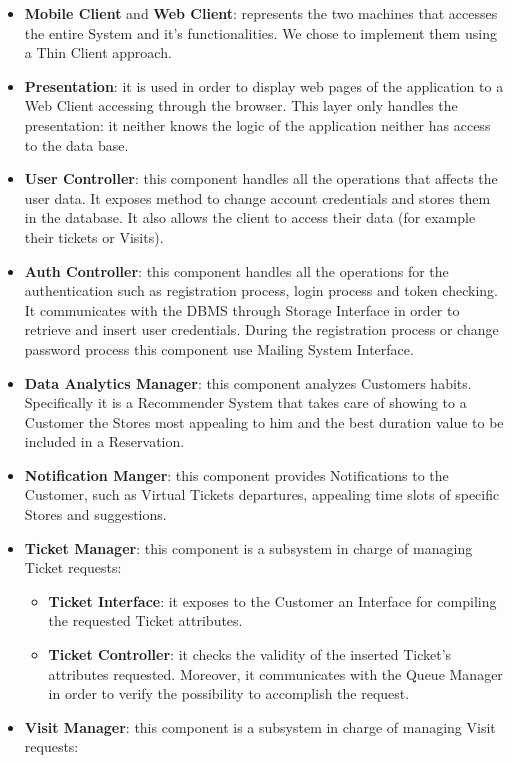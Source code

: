 \documentclass[a4paper, 12pt, oneside, table]{article}
\begin{document}
\begin{itemize}
    \item \label{cv:client}\textbf{Mobile Client} and \textbf{Web Client}: represents the two machines that accesses the entire System and it's functionalities. We chose to implement them using a Thin Client approach.
    \item \textbf{Presentation}: it is used in order to display web pages of the application to a Web Client accessing through the browser. This layer only handles the presentation: it neither knows the logic of the application neither has access to the data base.
    \item \textbf{User Controller}: this component handles all the operations that affects the user data. It exposes method to change account credentials and stores them in the database. It also allows the client to access their data (for example their tickets or Visits).
    \item \textbf{Auth Controller}: this component handles all the operations for the authentication such as registration process, login process and token checking. It communicates with the DBMS through Storage Interface in order to retrieve and insert user credentials. During the registration process or change password process this component use Mailing System Interface.
    \item \textbf{Data Analytics Manager}: this component analyzes Customers habits. Specifically it is a Recommender System that takes care of showing to a Customer the Stores most appealing to him and the best duration value to be included in a Reservation.
    \item \textbf{Notification Manger}: this component provides Notifications to the Customer, such as Virtual Tickets departures, appealing time slots of specific Stores and suggestions.
    \item \textbf{Ticket Manager}: this component is a subsystem in charge of managing Ticket requests:
    \begin{itemize}
        \item \textbf{Ticket Interface}: it exposes to the Customer an Interface for compiling the requested Ticket attributes.
        \item \textbf{Ticket Controller}: it checks the validity of the inserted Ticket's attributes requested. Moreover, it communicates with the Queue Manager in order to verify the possibility to accomplish the request.
    \end{itemize}
    \item \textbf{Visit Manager}: this component is a subsystem in charge of managing Visit requests:

\end{itemize}
\end{document}
